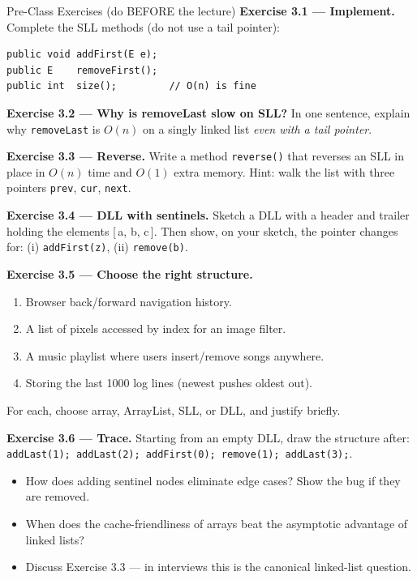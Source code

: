 \documentclass[11pt]{article}
\begin{document}
\begin{exbox}{Pre-Class Exercises (do BEFORE the lecture)}
\textbf{Exercise 3.1 --- Implement.} Complete the SLL methods (do not use a tail pointer):
\begin{lstlisting}
public void addFirst(E e);
public E    removeFirst();
public int  size();         // O(n) is fine
\end{lstlisting}

\textbf{Exercise 3.2 --- Why is removeLast slow on SLL?} In one sentence, explain why \texttt{removeLast} is $O(n)$ on a singly linked list \emph{even with a tail pointer}.

\textbf{Exercise 3.3 --- Reverse.} Write a method \verb|reverse()| that reverses an SLL in place in $O(n)$ time and $O(1)$ extra memory. Hint: walk the list with three pointers \texttt{prev}, \texttt{cur}, \texttt{next}.

\textbf{Exercise 3.4 --- DLL with sentinels.} Sketch a DLL with a header and trailer holding the elements [\,a, b, c\,]. Then show, on your sketch, the pointer changes for: (i) \texttt{addFirst(z)}, (ii) \texttt{remove(b)}.

\textbf{Exercise 3.5 --- Choose the right structure.}
\begin{enumerate}[label=(\alph*)]
  \item Browser back/forward navigation history.
  \item A list of pixels accessed by index for an image filter.
  \item A music playlist where users insert/remove songs anywhere.
  \item Storing the last 1000 log lines (newest pushes oldest out).
\end{enumerate}
For each, choose array, ArrayList, SLL, or DLL, and justify briefly.

\textbf{Exercise 3.6 --- Trace.} Starting from an empty DLL, draw the structure after:
\verb|addLast(1); addLast(2); addFirst(0); remove(1); addLast(3);|.
\end{exbox}

\begin{disbox}
\begin{itemize}[leftmargin=*]
  \item How does adding sentinel nodes eliminate edge cases? Show the bug if they are removed.
  \item When does the cache-friendliness of arrays beat the asymptotic advantage of linked lists?
  \item Discuss Exercise 3.3 --- in interviews this is the canonical linked-list question.
\end{itemize}
\end{disbox}
\end{document}
